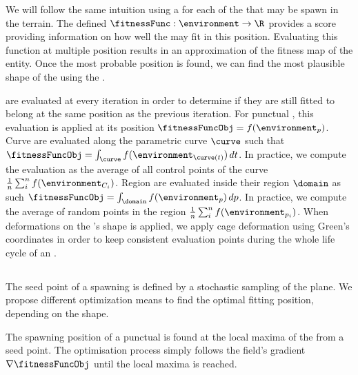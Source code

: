 We will follow the same intuition using a  for each of the  that may be spawn in the terrain. The  defined $\fitnessFunc: \environment \to \R$ provides a score providing information on how well the  may fit in this position. Evaluating this function at multiple position results in an approximation of the fitness map of the entity. Once the most probable position is found, we can find the most plausible shape of the  using the .

 are evaluated at every iteration in order to determine if they are still fitted to belong at the same position as the previous iteration. For punctual , this evaluation is applied at its position $\fitnessFuncObj = f(\environment_{p})$. Curve  are evaluated along the parametric curve $\curve$ such that $\fitnessFuncObj = \int_{\curve} f(\environment_{\curve(t)}) \,dt$. In practice, we compute the evaluation as the average of all control points of the curve $\frac{1}{n} \sum_{i}^{n}{f(\environment_{C_i})}$.
Region  are evaluated inside their region $\domain$ as such $\fitnessFuncObj = \int_{\domain} f(\environment_p) \,dp$. In practice, we compute the average of random points in the region $\frac{1}{n} \sum_{i}^{n}{f(\environment_{p_i})}$. When deformations on the 's shape is applied, we apply cage deformation using Green's coordinates in order to keep consistent evaluation points during the whole life cycle of an .

\subsection{}
The seed point of a spawning  is defined by a stochastic sampling of the plane. We propose different optimization means to find the optimal fitting position, depending on the  shape.

The spawning position of a punctual  is found at the local maxima of the  from a seed point. The optimisation process simply follows the field's gradient $\nabla \fitnessFuncObj$ until the local maxima is reached.


